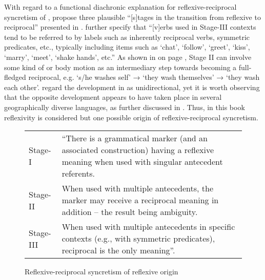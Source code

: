 With regard to a functional diachronic explanation for reflexive-reciprocal syncretism of , \citet[194]{heine:miyashita:2008} propose three plausible “[s]tages in the transition from reflexive to reciprocal” presented in . \citet[194]{heine:miyashita:2008} further specify that “[v]erbs used in Stage-III contexts tend to be referred to by labels such as inherently reciprocal verbs, symmetric predicates, etc., typically including items such as ‘chat’, ‘follow’, ‘greet’, ‘kiss’, ‘marry’, ‘meet’, ‘shake hands’, etc.” As shown in  on page \pageref{fig:ch7:unidirectional}, Stage II can involve some kind of  or body motion as an intermediary step towards becoming a full-fledged reciprocal, e.g. ‘s/he washes self’ → ‘they wash themselves’ → ‘they wash each other’. \citet[194]{heine:miyashita:2008} regard the development in  as unidirectional, yet it is worth observing that the opposite development appears to have taken place in several geographically diverse languages, as further discussed in . Thus, in this book reflexivity is considered but one possible origin of reflexive-reciprocal syncretism.

\begin{figure}
	\caption{Reflexive-reciprocal syncretism of reflexive origin}
	\label{fig:ch7:refl-recp}
	\begin{tabularx}{.90\textwidth}{lX}
		Stage-I & “There is a grammatical marker (and an associated construction) having a reflexive meaning when used with singular antecedent referents. \\
		Stage-II & When used with multiple antecedents, the marker may receive a reciprocal meaning in addition – the result being ambiguity. \\
		Stage-III & When used with multiple antecedents in specific contexts (e.g., with symmetric predicates), reciprocal is the only meaning”. \hfill \citep[194]{heine:miyashita:2008}
	\end{tabularx}
\end{figure}

